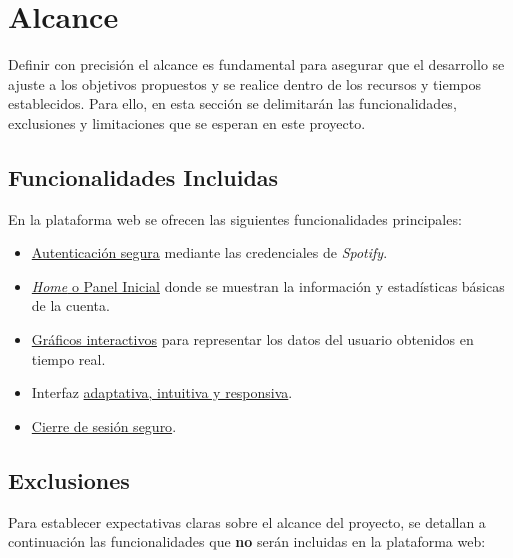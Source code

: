 \section{Alcance}

Definir con precisión el alcance es fundamental para asegurar que el desarrollo se ajuste a los objetivos propuestos y se realice dentro de los recursos y tiempos establecidos. Para ello, en esta sección se delimitarán las funcionalidades, exclusiones y limitaciones que se esperan en este proyecto.

\subsection{Funcionalidades Incluidas}

En la plataforma web se ofrecen las siguientes funcionalidades principales:

\begin{itemize}
    \item \underline{Autenticación segura} mediante las credenciales de \textit{Spotify}.
    \item \underline{\textit{Home} o Panel Inicial} donde se muestran la información y estadísticas básicas de la cuenta.
    \item \underline{Gráficos interactivos} para representar los datos del usuario obtenidos en tiempo real.
    \item Interfaz \underline{adaptativa, intuitiva y responsiva}.
    \item \underline{Cierre de sesión seguro}.
\end{itemize}

\subsection{Exclusiones}

Para establecer expectativas claras sobre el alcance del proyecto, se detallan a continuación las funcionalidades que \textbf{no} serán incluidas en la plataforma web:

